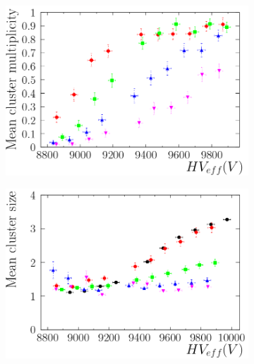 \begin{figure}[!h]
\begin{subfigure}{0.5\linewidth}
\begin{center}
					\caption{\label{fig:GIFResults:WP}}
				\end{center}
			\end{subfigure}
			\begin{subfigure}{0.5\linewidth}
				\begin{center}
					\includegraphics[width = 0.6\plotwidth]{fig/Clustermultiplicities.pdf}
					\caption{\label{fig:GIFResults:CM}}
				\end{center}
			\end{subfigure}
			\begin{subfigure}{0.5\linewidth}
				\begin{center}
					\includegraphics[width = 0.6\plotwidth]{fig/Clustersizes.pdf}\\
					\caption{\label{fig:GIFResults:CS}}
				\end{center}
			\end{subfigure}
			\caption{\label{fig:GIFResults} }
		\end{figure}
	
